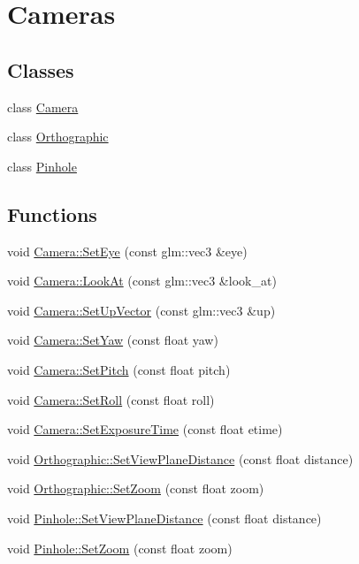 \hypertarget{group___cameras}{}\section{Cameras}
\label{group___cameras}
\subsection*{Classes}
\begin{DoxyCompactItemize}
\item 
class \hyperlink{class_camera}{Camera}
\item 
class \hyperlink{class_orthographic}{Orthographic}
\item 
class \hyperlink{class_pinhole}{Pinhole}
\end{DoxyCompactItemize}
\subsection*{Functions}
\begin{DoxyCompactItemize}
\item 
void \hyperlink{group___cameras_gad2265245e85699e077dc1d8d33eecece}{Camera\+::\+Set\+Eye} (const glm\+::vec3 \&eye)
\item 
void \hyperlink{group___cameras_ga92295d79a45f2ab1756221836567997a}{Camera\+::\+Look\+At} (const glm\+::vec3 \&look\+\_\+at)
\item 
void \hyperlink{group___cameras_gaa6c9c847b6db5c4d6450fb9b75f26e81}{Camera\+::\+Set\+Up\+Vector} (const glm\+::vec3 \&up)
\item 
void \hyperlink{group___cameras_ga0e499019f7cd3029602461fcd63aa40c}{Camera\+::\+Set\+Yaw} (const float yaw)
\item 
void \hyperlink{group___cameras_ga33e125b9d164e7332dba4cc01c468d6c}{Camera\+::\+Set\+Pitch} (const float pitch)
\item 
void \hyperlink{group___cameras_ga2c07ac7e812f4dab134fc06692fcaf11}{Camera\+::\+Set\+Roll} (const float roll)
\item 
void \hyperlink{group___cameras_gaf9985918fc0135ac8c98344c96129509}{Camera\+::\+Set\+Exposure\+Time} (const float etime)
\item 
void \hyperlink{group___cameras_ga4ad79de10c562075c049f2e580f48f9f}{Orthographic\+::\+Set\+View\+Plane\+Distance} (const float distance)
\item 
void \hyperlink{group___cameras_ga9a63b65c5228dc43caae0b986ea8d220}{Orthographic\+::\+Set\+Zoom} (const float zoom)
\item 
void \hyperlink{group___cameras_ga2757f00b8e8e778b6792b0c9e0e4052b}{Pinhole\+::\+Set\+View\+Plane\+Distance} (const float distance)
\item 
void \hyperlink{group___cameras_ga9baed583b61d1808867251fa33d4db56}{Pinhole\+::\+Set\+Zoom} (const float zoom)
\end{DoxyCompactItemize}


